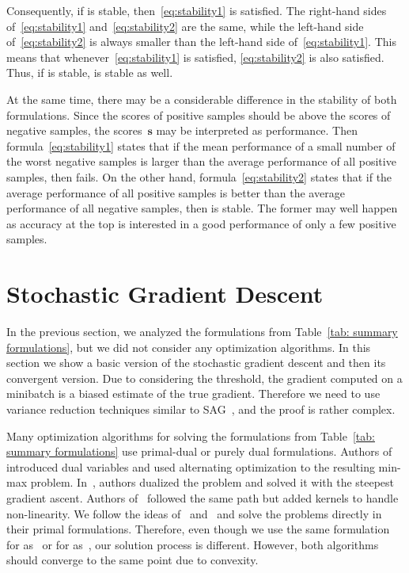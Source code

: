 Consequently, if \tauFPL is stable, then~\eqref{eq:stability1} is satisfied. The right-hand sides of~\eqref{eq:stability1} and~\eqref{eq:stability2} are the same, while the left-hand side of~\eqref{eq:stability2} is always smaller than the left-hand side of~\eqref{eq:stability1}. This means that whenever~\eqref{eq:stability1} is satisfied, \eqref{eq:stability2} is also satisfied. Thus, if \tauFPL is stable, \PatMatNP is stable as well.

At the same time, there may be a considerable difference in the stability of both formulations. Since the scores of positive samples should be above the scores of negative samples, the scores~$\bm{s}$ may be interpreted as performance. Then formula~\eqref{eq:stability1} states that if the mean performance of a small number of the worst negative samples is larger than the average performance of all positive samples, then \tauFPL fails. On the other hand, formula~\eqref{eq:stability2} states that if the average performance of all positive samples is better than the average performance of all negative samples, then \PatMatNP is stable. The former may well happen as accuracy at the top is interested in a good performance of only a few positive samples.

\section{Stochastic Gradient Descent}\label{sec:convergence}

In the previous section, we analyzed the formulations from Table~\ref{tab: summary formulations}, but we did not consider any optimization algorithms. In this section we show a basic version of the stochastic gradient descent and then its convergent version. Due to considering the threshold, the gradient computed on a minibatch is a biased estimate of the true gradient. Therefore we need to use variance reduction techniques similar to SAG~\cite{schmidt2017minimizing}, and the proof is rather complex.

Many optimization algorithms for solving the formulations from Table~\ref{tab: summary formulations} use primal-dual or purely dual formulations. Authors of~\cite{eban2017scalable} introduced dual variables and used alternating optimization to the resulting min-max problem. In~\cite{li2014top, zhang2018tau}, authors dualized the problem and solved it with the steepest gradient ascent. Authors of~\cite{macha2020nonlinear} followed the same path but added kernels to handle non-linearity. We follow the ideas of~\cite{mackey2018constrained} and~\cite{adam2019machine} and solve the problems directly in their primal formulations. Therefore, even though we use the same formulation for \TopPush as~\cite{li2014top} or for \tauFPL as~\cite{zhang2018tau}, our solution process is different. However, both algorithms should converge to the same point due to convexity.

